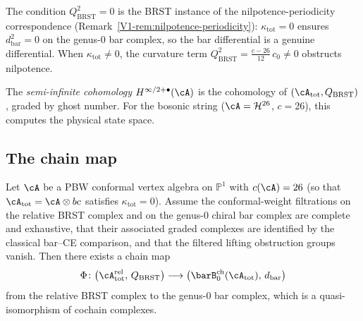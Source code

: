 \begin{remark}
\label{rem:brst-nilpotence-periodicity}
The condition $Q_{\mathrm{BRST}}^2 = 0$ is the BRST instance of the nilpotence-periodicity correspondence (Remark~\ref{V1-rem:nilpotence-periodicity}): $\kappa_{\mathrm{tot}} = 0$ ensures $d_{\mathrm{bar}}^2 = 0$ on the genus-$0$ bar complex, so the bar differential is a genuine differential. When $\kappa_{\mathrm{tot}} \neq 0$, the curvature term $Q_{\mathrm{BRST}}^2 = \frac{c-26}{12}\,c_0 \neq 0$ obstructs nilpotence.
\end{remark}

The \emph{semi-infinite cohomology} $H^{\infty/2+\bullet}(\cA)$
is the cohomology of $(\cA_{\mathrm{tot}}, Q_{\mathrm{BRST}})$, graded
by ghost number. For the bosonic string ($\cA = \mathcal{H}^{26}$,
$c = 26$), this computes the physical state space.

\subsection{The chain map}

\begin{theorem}
\label{thm:brst-bar-genus0}
Let $\cA$ be a PBW conformal vertex algebra on $\mathbb{P}^1$ with
$c(\cA) = 26$ \textup{(}so that
$\cA_{\mathrm{tot}} = \cA \otimes bc$ satisfies
$\kappa_{\mathrm{tot}} = 0$\textup{)}. Assume the conformal-weight
filtrations on the relative BRST complex and on the genus-$0$ chiral
bar complex are complete and exhaustive, that their associated graded
complexes are identified by the classical bar--CE comparison, and that
the filtered lifting obstruction groups vanish. Then there exists a
chain map
\[
\Phi \colon
 \bigl(\cA_{\mathrm{tot}}^{\mathrm{rel}},\, Q_{\mathrm{BRST}}\bigr)
 \longrightarrow
 \bigl(\barB^{\mathrm{ch}}_0(\cA_{\mathrm{tot}}),\, d_{\mathrm{bar}}\bigr)
\]
from the relative BRST complex to the genus-$0$ bar complex, which is a
quasi-isomorphism of cochain complexes.
\end{theorem}

